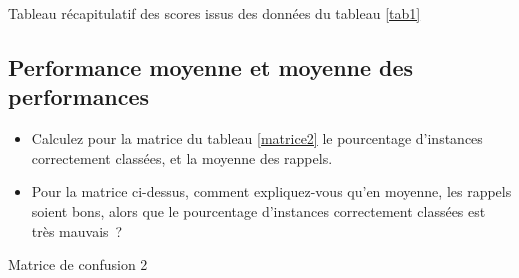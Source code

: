 \begin{table}

\caption{\label{tab2} Tableau récapitulatif des scores issus des données du tableau \ref{tab1}}
\end{table}

\subsection{Performance moyenne et moyenne des performances}
\begin{itemize}
  \item Calculez pour la matrice du tableau \ref{matrice2} le pourcentage d’instances correctement classées, et la moyenne des rappels.
  \item Pour la matrice ci-dessus, comment expliquez-vous qu’en moyenne, les rappels soient bons, alors que le pourcentage d’instances correctement classées est très mauvais ?
\end{itemize}

\begin{table}
  
  \caption{\label{matrice2} Matrice de confusion 2}
\end{table}
